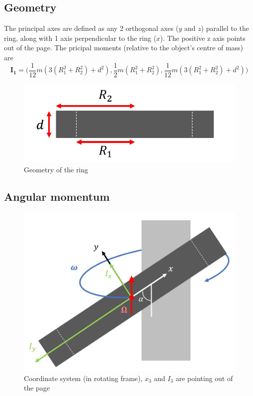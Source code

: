 \documentclass{scrartcl}
\begin{document}
\subsection{Geometry}
The principal axes are defined as any 2 orthogonal axes ($y$ and $z$) parallel to the ring, along with 1 axis perpendicular to the ring ($x$). The positive z axis points out of the page. The pricipal moments (relative to the object's centre of mass) are
\begin{equation}
    \mathbf{I_1}=\Bigg(\frac{1}{12}m(3(R_1^2+R_2^2)+d^2),
    \frac{1}{2}m(R_1^2+R_2^2),
    \frac{1}{12}m(3(R_1^2+R_2^2)+d^2)\Bigg)
\end{equation}
\begin{figure}[h]
    \centering
    \includegraphics[scale=0.5]{diagram2.jpg}
    \caption{Geometry of the ring}
    \label{1}
\end{figure}

\subsection{Angular momentum}
\begin{figure}[h]
    \centering
    \includegraphics[scale=0.4]{diagram1.jpg}
    \caption{Coordinate system (in rotating frame), $x_3$ and $I_3$ are pointing out of the page}
    \label{<2>}
\end{figure}
\end{document}

